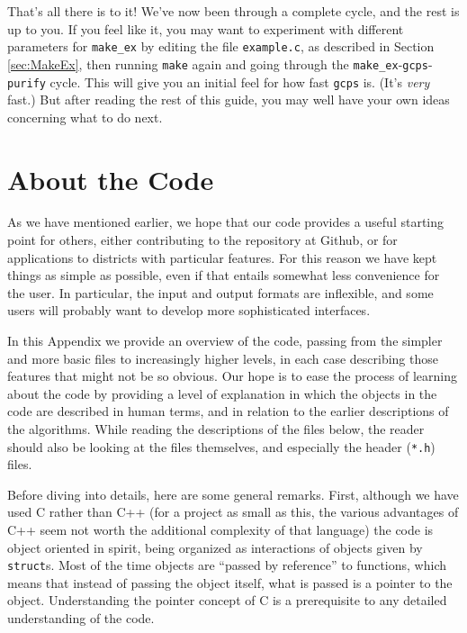 \documentclass[12pt]{article}
\theoremstyle{definition}
\begin{document}
\begin{appendix}
That's all there is to it! We've now been through a complete cycle,
and the rest is up to you.  If you feel like it, you may want to
experiment with different parameters for \texttt{make\_ex} by editing
the file \texttt{example.c}, as described in Section \ref{sec:MakeEx},
then running \texttt{make} again and going through the
\texttt{make\_ex}-\texttt{gcps}- \texttt{purify} cycle.  This will
give you an initial feel for how fast \texttt{gcps} is.  (It's
\textit{very} fast.)  But after reading the rest of this guide, you
may well have your own ideas concerning what to do next.

\section{About the Code} \label{app:Code}

As we have mentioned earlier, we hope that our code provides a useful
starting point for others, either contributing to the repository at
Github, or for applications to districts with particular features.
For this reason we have kept things as simple as possible, even if
that entails somewhat less convenience for the user.  In particular,
the input and output formats are inflexible, and some users will
probably want to develop more sophisticated interfaces.

In this Appendix we provide an overview of the code, passing from the
simpler and more basic files to increasingly higher levels, in each
case describing those features that might not be so obvious.  Our hope
is to ease the process of learning about the code by providing a level
of explanation in which the objects in the code are described in human
terms, and in relation to the earlier descriptions of the algorithms.
While reading the descriptions of the files below, the reader should
also be looking at the files themselves, and especially the header
(\texttt{*.h}) files.

Before diving into details, here are some general remarks.  First,
although we have used C rather than C++ (for a project as small as
this, the various advantages of C++ seem not worth the additional
complexity of that language) the code is object oriented in spirit,
being organized as interactions of objects given by \texttt{struct}s.
Most of the time objects are ``passed by reference'' to functions,
which means that instead of passing the object itself, what is passed
is a pointer to the object.  Understanding the pointer concept of C is
a prerequisite to any detailed understanding of the code.


\end{appendix}
\end{document}
